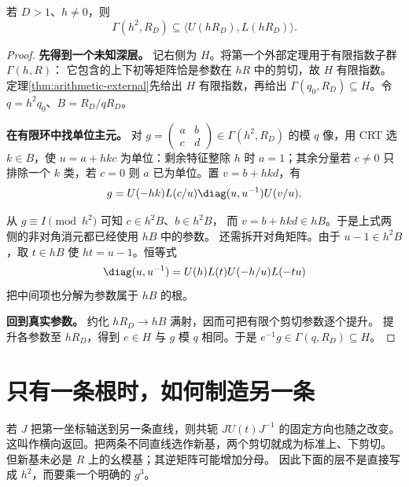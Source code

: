 \begin{lemma}[两条根生成一个确定的同余层]\label{lem:deep}
若 $D>1$、$h\ne0$，则
\[
\Gamma(h^2,R_D)\subseteq\langle U(hR_D),L(hR_D)\rangle.
\]
\end{lemma}
\begin{proof}

\par\noindent\textbf{先得到一个未知深层。}
记右侧为 $H$。将第一个外部定理用于有限指数子群 $\Gamma(h,R)$：
它包含的上下初等矩阵恰是参数在 $hR$ 中的剪切，故 $H$ 有限指数。
定理\ref{thm:arithmetic-external}先给出 $H$ 有限指数，再给出 $\Gamma(q_0,R_D)\subseteq H$。令 $q=h^2q_0$、$B=R_D/qR_D$。

\par\noindent\textbf{在有限环中找单位主元。}
对 $g=\left(\begin{smallmatrix}a&b\\c&d\end{smallmatrix}\right)\in\Gamma(h^2,R_D)$ 的模 $q$ 像，用 CRT 选 $k\in B$，使 $u=a+hkc$ 为单位：剩余特征整除 $h$ 时 $a=1$；其余分量若 $c\ne0$ 只排除一个 $k$ 类，若 $c=0$ 则 $a$ 已为单位。置 $v=b+hkd$，有
\[
g=U(-hk)L(c/u)\diag(u,u^{-1})U(v/u).
\]

从 $g\equiv I\pmod{h^2}$ 可知 $c\in h^2B$、$b\in h^2B$，
而 $v=b+hkd\in hB$。于是上式两侧的非对角消元都已经使用 $hB$ 中的参数。
还需拆开对角矩阵。由于 $u-1\in h^2B$，取 $t\in hB$ 使 $ht=u-1$。恒等式
\[
\diag(u,u^{-1})=U(h)L(t)U(-h/u)L(-tu)
\]
把中间项也分解为参数属于 $hB$ 的根。
\par\noindent\textbf{回到真实参数。}
约化 $hR_D\to hB$ 满射，因而可把有限个剪切参数逐个提升。
提升各参数至 $hR_D$，得到 $e\in H$ 与 $g$ 模 $q$ 相同。于是 $e^{-1}g\in\Gamma(q,R_D)\subseteq H$。
\end{proof}


\section{只有一条根时，如何制造另一条}
若 $J$ 把第一坐标轴送到另一条直线，则共轭 $JU(t)J^{-1}$ 的固定方向也随之改变。
这叫作横向返回。把两条不同直线选作新基，两个剪切就成为标准上、下剪切。
但新基未必是 $R$ 上的幺模基；其逆矩阵可能增加分母。
因此下面的层不是直接写成 $h^2$，而要乘一个明确的 $g^3$。


